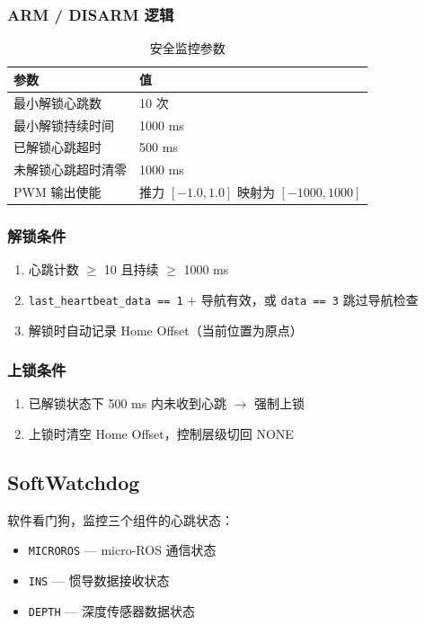 \documentclass[12pt,a4paper]{article}
\begin{document}
\subsubsection{ARM / DISARM 逻辑}

\begin{table}[H]
\centering
\begin{tabularx}{\textwidth}{lX}
\toprule
\textbf{参数} & \textbf{值} \\
\midrule
最小解锁心跳数 & 10 次 \\
最小解锁持续时间 & 1000 ms \\
已解锁心跳超时 & 500 ms \\
未解锁心跳超时清零 & 1000 ms \\
PWM 输出使能 & 推力 $[-1.0, 1.0]$ 映射为 $[-1000, 1000]$ \\
\bottomrule
\end{tabularx}
\caption{安全监控参数}
\end{table}

\subsubsection{解锁条件}
\begin{enumerate}
    \item 心跳计数 $\geq$ 10 且持续 $\geq$ 1000 ms
    \item \texttt{last\_heartbeat\_data == 1} + 导航有效，或 \texttt{data == 3} 跳过导航检查
    \item 解锁时自动记录 Home Offset（当前位置为原点）
\end{enumerate}

\subsubsection{上锁条件}
\begin{enumerate}
    \item 已解锁状态下 500 ms 内未收到心跳 $\rightarrow$ 强制上锁
    \item 上锁时清空 Home Offset，控制层级切回 NONE
\end{enumerate}

\subsection{SoftWatchdog}

软件看门狗，监控三个组件的心跳状态：

\begin{itemize}
    \item \texttt{MICROROS} — micro-ROS 通信状态
    \item \texttt{INS} — 惯导数据接收状态
    \item \texttt{DEPTH} — 深度传感器数据状态
\end{itemize}
\end{document}
